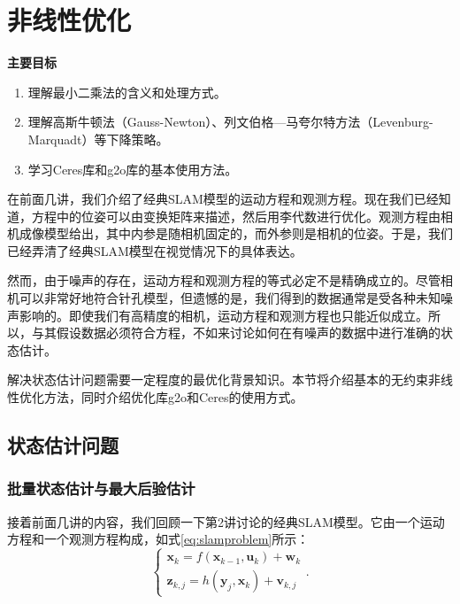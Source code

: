 \chapter{非线性优化}
\label{cpt:6}
\begin{mdframed}  
	\textbf{主要目标}
	\begin{enumerate}[labelindent=0em,leftmargin=1.5em]
		\item 理解最小二乘法的含义和处理方式。
		\item 理解高斯牛顿法（Gauss-Newton）、列文伯格—马夸尔特方法（Levenburg-\\Marquadt）等下降策略。
		\item 学习Ceres库和g2o库的基本使用方法。
	\end{enumerate}
\end{mdframed} 

在前面几讲，我们介绍了经典SLAM模型的运动方程和观测方程。现在我们已经知道，方程中的位姿可以由变换矩阵来描述，然后用李代数进行优化。观测方程由相机成像模型给出，其中内参是随相机固定的，而外参则是相机的位姿。于是，我们已经弄清了经典SLAM模型在视觉情况下的具体表达。

然而，由于噪声的存在，运动方程和观测方程的等式必定不是精确成立的。尽管相机可以非常好地符合针孔模型，但遗憾的是，我们得到的数据通常是受各种未知噪声影响的。即使我们有高精度的相机，运动方程和观测方程也只能近似成立。所以，与其假设数据必须符合方程，不如来讨论如何在有噪声的数据中进行准确的状态估计。

解决状态估计问题需要一定程度的最优化背景知识。本节将介绍基本的无约束非线性优化方法，同时介绍优化库g2o和Ceres的使用方式。

\newpage


\newpage 
\section{状态估计问题}
\subsection{批量状态估计与最大后验估计}
接着前面几讲的内容，我们回顾一下第2讲讨论的经典SLAM模型。它由一个运动方程和一个观测方程构成，如式\eqref{eq:slamproblem}所示：
\begin{equation}
\left\{ \begin{array}{l}
{\bm{x}_k} = f\left( {{\bm{x}_{k - 1}},{\bm{u}_k}} \right) + \bm{w}_k\\
{\bm{z}_{k,j}} = h\left( {{ \bm{y}_j},{ \bm{x}_k}}  \right)+ \bm{v}_{k,j}
\end{array} \right. .
\end{equation}


